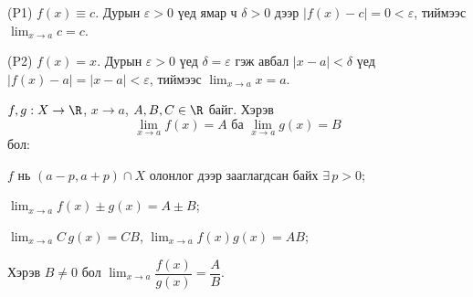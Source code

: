 \begin{prof}
(P1) $f(x)\equiv c$. Дурын $\varepsilon>0$ үед ямар ч $\delta>0$ дээр $|f(x)-c|=0<\varepsilon$, тиймээс $\lim_{x\to a}c=c$.

(P2) $f(x)=x$. Дурын $\varepsilon>0$ үед $\delta=\varepsilon$ гэж авбал $|x-a|<\delta$ үед $|f(x)-a|=|x-a|<\varepsilon$, тиймээс $\lim_{x\to a}x=a$.
\end{prof}
\begin{theorem}\label{aritlim}
$f,g:X\to\R$, $x\to a$, $A,B,C\in\R$ байг. Хэрэв $$\displaystyle\lim_{x\to a} f(x)=A \text{ ба } \displaystyle\lim_{x\to a} g(x)=B$$ бол:
\begin{description}[leftmargin=2em]
  \item[(P3)] $f$ нь $(a-p,a+p)\cap X$ олонлог дээр зааглагдсан байх  $\exists\,p>0$;
  \item[(P4)] $\displaystyle\lim_{x\to a}f(x)\pm g(x)=A\pm B$;
  \item[(P5)] $\displaystyle\lim_{x\to a} C\,g(x)=CB$, \quad $\displaystyle\lim_{x\to a} f(x)g(x)=AB$;
  \item[(P6)] Хэрэв $B\neq 0$ бол $\displaystyle\lim_{x\to a}\dfrac{f(x)}{g(x)}=\dfrac{A}{B}$.
\end{description}
\end{theorem}

